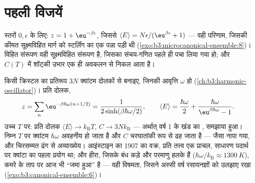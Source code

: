 \section{पहली विजयें}

\begin{example}[दो स्तर, दो पंक्तियों में]\label{ex:b3:canonical-ensemble:twolevel}
स्तरों $0, \epsilon$ के लिए: $z = 1 + \eu^{-\beta\epsilon}$, जिससे
$\langle E\rangle = N\epsilon/(\eu^{\beta\epsilon} + 1)$ --- वही
परिणाम, जिसकी कीमत सूक्ष्मविहित मार्ग को स्टर्लिंग का एक पन्ना पड़ी
थी (\cref{exo:b3:microcanonical-ensemble:8})। विहित संरूपण वही
सूक्ष्मविहित संरूपण है, जिसका संचय-गणित पहले ही पचा लिया गया हो; और
$C(T)$ में शॉट्की उभार एक ही अवकलन से निकल आता है।
\end{example}

\begin{example}[आइंस्टाइन का ठोस, और द्यूलों--प्टी की मृत्यु]\label{ex:b3:canonical-ensemble:einstein}
किसी क्रिस्टल का प्रतिरूप $3N$ क्वांटम दोलकों से बनाइए, जिनकी आवृत्ति
$\omega$ हो (\cref{ch:b3:harmonic-oscillator})। प्रति दोलक,
\[
z = \sum_n\eu^{-\beta\hbar\omega(n + 1/2)}
 = \frac{1}{2\sinh(\beta\hbar\omega/2)} , \qquad
\langle E\rangle = \frac{\hbar\omega}{2} +
\frac{\hbar\omega}{\eu^{\beta\hbar\omega} - 1} .
\]
उच्च $T$ पर: प्रति दोलक $\langle E\rangle \to k_{\text{B}}T$,
$C \to 3Nk_{\text{B}}$ --- अर्थात् वर्ष 1 के खंड का , समझाया हुआ। निम्न $T$ पर क्वांटम $\hbar\omega$ अवहनीय हो जाता
है और $C$ चरघातांकी रूप से ढह जाता है --- जैसा नापा गया, और
चिरसम्मत ढंग से अव्याख्येय। आइंस्टाइन का 1907 का वक्र, प्रति तत्त्व
एक प्राचल, साधारण पदार्थ पर क्वांटा का पहला प्रयोग था;
और हीरा, जिसके बंध कड़े और परमाणु हलके हैं ($\hbar\omega/k_{\text{B}}
\approx \qty{1300}{K}$), कमरे के ताप पर आज भी ``जमा हुआ'' है ---
वही विषमता, जिसने अस्सी वर्ष रसायनज्ञों को उलझाए रखा
(\cref{exo:b3:canonical-ensemble:6})।
\end{example}

